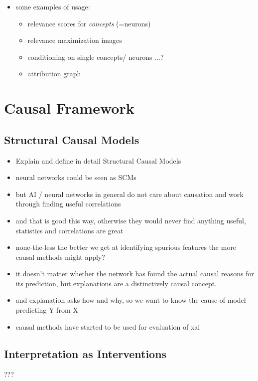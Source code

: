 \begin{itemize}
    \item some examples of usage:
          \begin{itemize}
              \item relevance scores for \textit{concepts} (=neurons)
              \item relevance maximization images
              \item conditioning on single concepts/ neurons ...?
              \item attribution graph
          \end{itemize}
\end{itemize}


\section{Causal Framework}
\subsection{Structural Causal Models}

\begin{itemize}
    \item Explain and define in detail Structural Causal Models
    \item neural networks could be seen as SCMs \cite{Chattopadhyay2019}
    \item but AI / neural networks in general do not care about causation and work through finding useful correlations
    \item and that is good this way, otherwise they would never find anything useful, statistics and correlations are great
    \item none-the-less the better we get at identifying spurious features the more causal methods might apply?
    \item it doesn't matter whether the network has found the actual causal reasons for its prediction, but explanations are a distinctively causal concept.
    \item and explanation asks how and why, so we want to know the cause of model predicting Y from X
    \item causal methods have started to be used for evaluation of xai
\end{itemize}

\subsection{Interpretation as Interventions}
???

